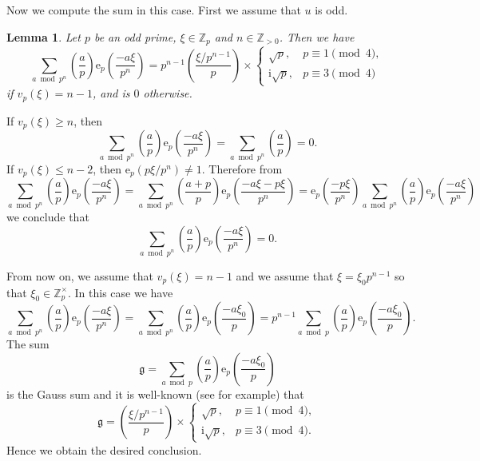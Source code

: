 \documentclass[10pt,oneside,reqno]{amsart}
\makeatletter
\newcommand\rme{\mathrm{e}}
\newcommand\rmi{\mathrm{i}}
\newcommand\ZZ{\mathbb{Z}}
\newcommand\mf[1]{\mathfrak{#1}}
\renewcommand\leq{\leqslant}
\renewcommand\geq{\geqslant}
\newcommand\legendresymbol[2]{\genfrac{(}{)}{}{}{#1}{#2}}
\theoremstyle{THEOREM}
\newtheorem{lemma}[theorem]{Lemma}
\theoremstyle{DEFINITION}
\theoremstyle{EXERCISE}
\numberwithin{equation}{section}
\renewenvironment{proof}[1][\proofname]{\par
  \vspace{-6pt}
  \pushQED{\qed}
  \normalfont \topsep6\p@\@plus6\p@\relax
  \trivlist
  \item[\hskip\labelsep\rmfamily\bfseries
    #1\@addpunct{:}]\ignorespaces
}{
  \popQED\endtrivlist\@endpefalse
  \vspace{-6pt}
}
\makeatother
\begin{document}
Now we compute the sum in this case. First we assume that $u$ is odd.
\begin{lemma}\label{lem:gausssumsplit}
Let $p$ be an odd prime, $\xi\in \ZZ_p$ and $n\in \ZZ_{>0}$. Then we have
\[
\sum_{a\bmod p^n}\legendresymbol{a}{p}\rme_p\legendresymbol{-a\xi}{p^{n}}= p^{n-1} \legendresymbol{\xi/p^{n-1}}{p}\times \begin{cases}
                                              \sqrt{p}, & p\equiv 1\pmod 4,\\
                                              \rmi\sqrt{p}, & p\equiv 3\pmod 4 
                                            \end{cases}
\]
if $v_p(\xi)=n-1$, and is $0$ otherwise. 
\end{lemma}
\begin{proof}
If $v_p(\xi)\geq n$, then 
\[
\sum_{a\bmod p^n}\legendresymbol{a}{p}\rme_p\legendresymbol{-a\xi}{p^{n}}=\sum_{a\bmod p^n}\legendresymbol{a}{p}=0.
\]
If $v_p(\xi)\leq n-2$, then $\rme_p(p\xi/p^n)\neq 1$. Therefore from
\[
\sum_{a\bmod p^n}\legendresymbol{a}{p}\rme_p\legendresymbol{-a\xi}{p^{n}}=\sum_{a\bmod p^n}\legendresymbol{a+p}{p}\rme_p\legendresymbol{-a\xi-p\xi}{p^{n}}= \rme_p\legendresymbol{-p\xi}{p^{n}}\sum_{a\bmod p^n}\legendresymbol{a}{p}\rme_p\legendresymbol{-a\xi}{p^{n}}
\]
we conclude that 
\[
\sum_{a\bmod p^n}\legendresymbol{a}{p}\rme_p\legendresymbol{-a\xi}{p^{n}}=0.
\]

From now on, we assume that $v_p(\xi)=n-1$ and we assume that $\xi=\xi_0p^{n-1}$ so that $\xi_0\in \ZZ_p^\times$. In this case we have
\[
\sum_{a\bmod p^n}\legendresymbol{a}{p}\rme_p\legendresymbol{-a\xi}{p^{n}}= \sum_{a\bmod p^n}\legendresymbol{a}{p}\rme_p\legendresymbol{-a\xi_0}{p}=p^{n-1}\sum_{a\bmod p}\legendresymbol{a}{p}\rme_p\legendresymbol{-a\xi_0}{p}.
\]
The sum 
\[
\mf{g}=\sum_{a\bmod p}\legendresymbol{a}{p}\rme_p\legendresymbol{-a\xi_0}{p}
\]
is the Gauss sum and it is well-known (see \cite{shafarevich1966} for example) that
\[
\mf{g}=\legendresymbol{\xi/p^{n-1}}{p}\times \begin{cases}
                                              \sqrt{p}, & p\equiv 1\pmod 4,\\
                                              \rmi\sqrt{p}, & p\equiv 3\pmod 4 .
                                            \end{cases}
\]
Hence we obtain the desired conclusion.
\end{proof}
\end{document}
